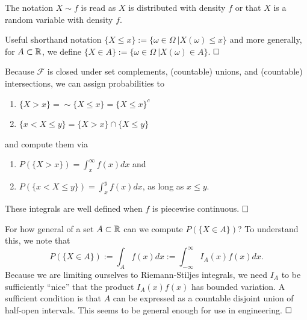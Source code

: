 \begin{notation} The notation $X \sim f$ is read as $X$ is distributed with density $f$ or that $X$ is a random variable with density $f$.
\end{notation}


\begin{rem} Useful shorthand notation $\{ X \le x\}:=\{\omega \in \Omega~| X(\omega) \le x\}$ and more generally, for $A\subset \mathbb R$, we define $\{ X \in A\}:=\{\omega \in \Omega~| X(\omega) \in A\}$. 
$\hfill \square$  \end{rem} 

\begin{rem} Because $\mathscr{F}$ is closed under set complements, (countable) unions, and (countable) intersections, we can assign probabilities to
\begin{enumerate}
\setlength{\itemsep}{.2cm}
\renewcommand{\labelenumi}{(\alph{enumi})}
     \item $\{ X > x\}=\sim \{ X \le x\} = \{ X \le x\}^{c}$
     \item  $\{ x < X \le y\}= \{ X > x\} \cap  \{ X \le y\}$
\end{enumerate}
and compute them via 
\begin{enumerate}
\setlength{\itemsep}{.2cm}
\renewcommand{\labelenumi}{(\alph{enumi})}
     \item $P(\{ X > x\})= \int_{x}^{\infty} f(x) dx$ and 
     \item  $P(\{ x < X \le y\})=\int_{x}^{y} f(x) dx$, as long as $x \le y$.
\end{enumerate}
These integrals are well defined when $f$ is piecewise continuous.
$\hfill \square$  \end{rem} 


\begin{rem}
For how general of a set $A\subset \mathbb R$ can we compute $P(\{ X \in A \})$? To understand this, we note that
\begin{equation}
\label{eq:IntegralOverA}
    P(\{ X \in A \}) :=  \int_{A} f(x) dx := \int_{-\infty}^{\infty} I_A(x) f(x) dx.
\end{equation} 
Because we are limiting ourselves to Riemann-Stiljes integrals, we need $I_A$ to be sufficiently ``nice'' that the product $I_A(x) f(x)$ has bounded variation. A sufficient condition is that $A$
can be expressed as a countable disjoint union of half-open intervals. This seems to be general enough for use in engineering.
$\hfill \square$  \end{rem}


